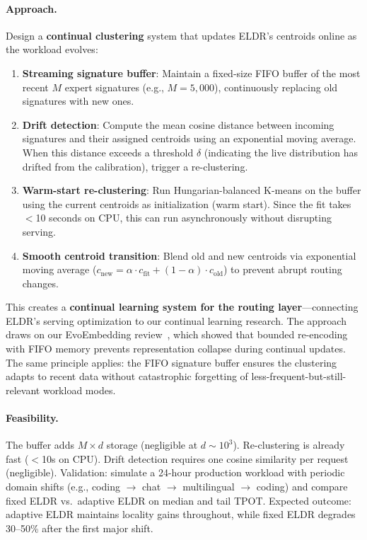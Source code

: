 \documentclass[11pt,a4paper]{article}
\begin{document}
\paragraph{Approach.} Design a \textbf{continual clustering} system that updates ELDR's centroids online as the workload evolves:
\begin{enumerate}
\item \textbf{Streaming signature buffer}: Maintain a fixed-size FIFO buffer of the most recent $M$ expert signatures (e.g., $M = 5{,}000$), continuously replacing old signatures with new ones.
\item \textbf{Drift detection}: Compute the mean cosine distance between incoming signatures and their assigned centroids using an exponential moving average. When this distance exceeds a threshold $\delta$ (indicating the live distribution has drifted from the calibration), trigger a re-clustering.
\item \textbf{Warm-start re-clustering}: Run Hungarian-balanced K-means on the buffer using the current centroids as initialization (warm start). Since the fit takes $<$10 seconds on CPU, this can run asynchronously without disrupting serving.
\item \textbf{Smooth centroid transition}: Blend old and new centroids via exponential moving average ($c_{\mathrm{new}} = \alpha \cdot c_{\mathrm{fit}} + (1-\alpha) \cdot c_{\mathrm{old}}$) to prevent abrupt routing changes.
\end{enumerate}
This creates a \textbf{continual learning system for the routing layer}---connecting ELDR's serving optimization to our continual learning research. The approach draws on our EvoEmbedding review~\cite{li2026evoembedding}, which showed that bounded re-encoding with FIFO memory prevents representation collapse during continual updates. The same principle applies: the FIFO signature buffer ensures the clustering adapts to recent data without catastrophic forgetting of less-frequent-but-still-relevant workload modes.

\paragraph{Feasibility.} The buffer adds $M \times d$ storage (negligible at $d \sim 10^3$). Re-clustering is already fast ($<$10s on CPU). Drift detection requires one cosine similarity per request (negligible). Validation: simulate a 24-hour production workload with periodic domain shifts (e.g., coding $\to$ chat $\to$ multilingual $\to$ coding) and compare fixed ELDR vs.\ adaptive ELDR on median and tail TPOT. Expected outcome: adaptive ELDR maintains locality gains throughout, while fixed ELDR degrades 30--50\% after the first major shift.
\end{document}
